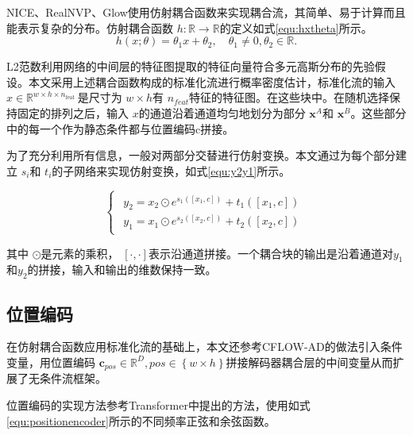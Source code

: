 NICE\cite{dinhNICENonlinearIndependent2015}、RealNVP\cite{dinhDensityEstimationUsing2017}、Glow\cite{kingmaGlowGenerativeFlow2018}使用仿射耦合函数来实现耦合流，其简单、易于计算而且能表示复杂的分布。仿射耦合函数 $h: \mathbb{R} \rightarrow \mathbb{R}$的定义如式\ref{equ:hxtheta}所示。
\begin{equation}\label{equ:hxtheta}
    h(x ; \theta)=\theta_{1} x+\theta_{2}, \quad \theta_{1} \neq 0, \theta_{2} \in \mathbb{R} .
\end{equation}


L2范数利用网络的中间层的特征图提取的特征向量符合多元高斯分布的先验假设。本文采用上述耦合函数构成的标准化流进行概率密度估计，标准化流的输入 $x \in \mathbb{R}^{w \times h \times n_{\text {feat }}}$是尺寸为 $w \times h$有 $n_{feat}$特征的特征图。在这些块中。在随机选择保持固定的排列之后，输入 $x$的通道沿着通道均匀地划分为部分 $\mathbf{x}^{A}$和 $\mathbf{x}^{B}$。这些部分中的每一个作为静态条件都与位置编码c拼接。

为了充分利用所有信息，一般对两部分交替进行仿射变换。本文通过为每个部分建立 $s_{i}$和 $t_{i}$的子网络来实现仿射变换，如式\ref{equ:y2y1}所示。

\begin{equation}\label{equ:y2y1}
    \left\{\begin{matrix}
        \begin{array}{c}y_{2}=x_{2} \odot e^{s_{1}\left(\left[x_{1}, c\right]\right)}+t_{1}\left(\left[x_{1}, c\right]\right) \\y_{1}=x_{1} \odot e^{s_{2}\left(\left[x_{2}, c\right]\right)}+t_{2}\left(\left[x_{2}, c\right]\right)\end{array}
        \end{matrix}\right.
\end{equation}

其中 $\odot$是元素的乘积， $\left[ ·,·\right]$表示沿通道拼接。一个耦合块的输出是沿着通道对$y_{1}$和$y_{2}$的拼接，输入和输出的维数保持一致。

\subsection{位置编码} 

在仿射耦合函数应用标准化流的基础上，本文还参考CFLOW-AD\cite{gudovskiyCFLOWADRealTimeUnsupervised2022}的做法引入条件变量，用位置编码 $\boldsymbol{c}_{pos} \in \mathbb{R}^{D}, pos \in\left\{w \times h\right\}$拼接解码器耦合层的中间变量从而扩展了无条件流框架。

位置编码的实现方法参考Transformer\cite{vaswaniAttentionAllYou2017}中提出的方法，使用如式\ref{equ:positionencoder}所示的不同频率正弦和余弦函数。

